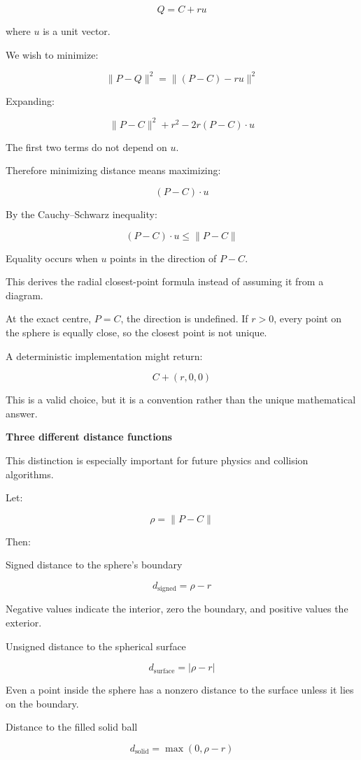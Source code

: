 \[
Q=C+ru
\]

where \(u\) is a unit vector.

We wish to minimize:

\[
\|P-Q\|^2 =\|(P-C)-ru\|^2
\]

Expanding:

\[
\|P-C\|^2+r^2-2r(P-C)\cdot u
\]

The first two terms do not depend on \(u\).

Therefore minimizing distance means maximizing:

\[
(P-C)\cdot u
\]

By the Cauchy--Schwarz inequality:

\[
(P-C)\cdot u\le\|P-C\|
\]

Equality occurs when \(u\) points in the direction of \(P-C\).

This derives the radial closest-point formula instead of assuming it from a diagram.

At the exact centre, \(P=C\), the direction is undefined. If \(r>0\), every point on the sphere is equally close, so the closest point is not unique.

A deterministic implementation might return:

\[
C+(r,0,0)
\]

This is a valid choice, but it is a convention rather than the unique mathematical answer.

\textbf{Three different distance functions}

This distinction is especially important for future physics and collision algorithms.

Let:

\[
\rho=\|P-C\|
\]

Then:

Signed distance to the sphere's boundary

\[
\boxed{d_{\mathrm{signed}}=\rho-r}
\]

Negative values indicate the interior, zero the boundary, and positive values the exterior.

Unsigned distance to the spherical surface

\[
\boxed{d_{\mathrm{surface}}=|\rho-r|}
\]

Even a point inside the sphere has a nonzero distance to the surface unless it lies on the boundary.

Distance to the filled solid ball

\[
\boxed{d_{\mathrm{solid}}=\max(0,\rho-r)}
\]

